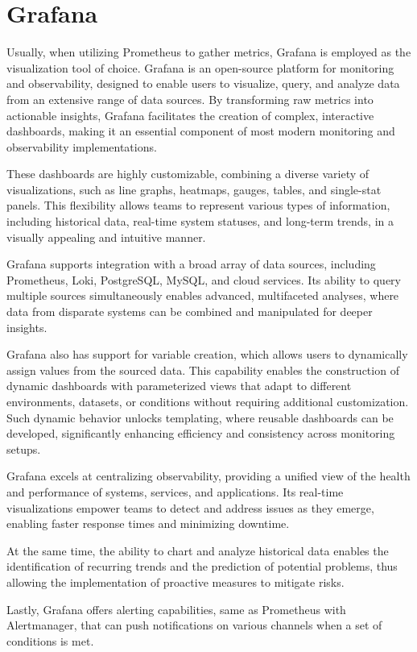 \section{Grafana}
Usually, when utilizing Prometheus to gather metrics, Grafana is employed as the visualization tool of choice. Grafana is an open-source platform for monitoring and observability, designed to enable users to visualize, query, and analyze data from an extensive range of data sources. By transforming raw metrics into actionable insights, Grafana facilitates the creation of complex, interactive dashboards, making it an essential component of most modern monitoring and observability implementations.

These dashboards are highly customizable, combining a diverse variety of visualizations, such as line graphs, heatmaps, gauges, tables, and single-stat panels. This flexibility allows teams to represent various types of information, including historical data, real-time system statuses, and long-term trends, in a visually appealing and intuitive manner.

Grafana supports integration with a broad array of data sources, including Prometheus, Loki, PostgreSQL, MySQL, and cloud services. Its ability to query multiple sources simultaneously enables advanced, multifaceted analyses, where data from disparate systems can be combined and manipulated for deeper insights.

Grafana also has support for variable creation, which allows users to dynamically assign values from the sourced data. This capability enables the construction of dynamic dashboards with parameterized views that adapt to different environments, datasets, or conditions without requiring additional customization. Such dynamic behavior unlocks templating, where reusable dashboards can be developed, significantly enhancing efficiency and consistency across monitoring setups.

Grafana excels at centralizing observability, providing a unified view of the health and performance of systems, services, and applications. Its real-time visualizations empower teams to detect and address issues as they emerge, enabling faster response times and minimizing downtime.

At the same time, the ability to chart and analyze historical data enables the identification of recurring trends and the prediction of potential problems, thus allowing the implementation of proactive measures to mitigate risks.

Lastly, Grafana offers alerting capabilities, same as Prometheus with Alertmanager, that can push notifications on various channels when a set of conditions is met\cite{grafana, promandgraf}.

